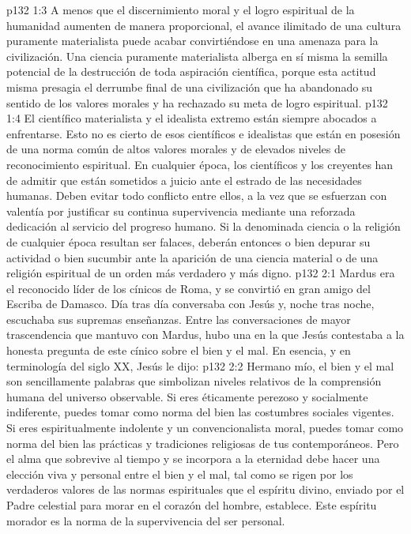 \vs p132 1:3 A menos que el discernimiento moral y el logro espiritual de la humanidad aumenten de manera proporcional, el avance ilimitado de una cultura puramente materialista puede acabar convirtiéndose en una amenaza para la civilización. Una ciencia puramente materialista alberga en sí misma la semilla potencial de la destrucción de toda aspiración científica, porque esta actitud misma presagia el derrumbe final de una civilización que ha abandonado su sentido de los valores morales y ha rechazado su meta de logro espiritual.
\vs p132 1:4 El científico materialista y el idealista extremo están siempre abocados a enfrentarse. Esto no es cierto de esos científicos e idealistas que están en posesión de una norma común de altos valores morales y de elevados niveles de reconocimiento espiritual. En cualquier época, los científicos y los creyentes han de admitir que están sometidos a juicio ante el estrado de las necesidades humanas. Deben evitar todo conflicto entre ellos, a la vez que se esfuerzan con valentía por justificar su continua supervivencia mediante una reforzada dedicación al servicio del progreso humano. Si la denominada ciencia o la religión de cualquier época resultan ser falaces, deberán entonces o bien depurar su actividad o bien sucumbir ante la aparición de una ciencia material o de una religión espiritual de un orden más verdadero y más digno.
\vs p132 2:1 Mardus era el reconocido líder de los cínicos de Roma, y se convirtió en gran amigo del Escriba de Damasco. Día tras día conversaba con Jesús y, noche tras noche, escuchaba sus supremas enseñanzas. Entre las conversaciones de mayor trascendencia que mantuvo con Mardus, hubo una en la que Jesús contestaba a la honesta pregunta de este cínico sobre el bien y el mal. En esencia, y en terminología del siglo XX, Jesús le dijo:
\vs p132 2:2 \pc Hermano mío, el bien y el mal son sencillamente palabras que simbolizan niveles relativos de la comprensión humana del universo observable. Si eres éticamente perezoso y socialmente indiferente, puedes tomar como norma del bien las costumbres sociales vigentes. Si eres espiritualmente indolente y un convencionalista moral, puedes tomar como norma del bien las prácticas y tradiciones religiosas de tus contemporáneos. Pero el alma que sobrevive al tiempo y se incorpora a la eternidad debe hacer una elección viva y personal entre el bien y el mal, tal como se rigen por los verdaderos valores de las normas espirituales que el espíritu divino, enviado por el Padre celestial para morar en el corazón del hombre, establece. Este espíritu morador es la norma de la supervivencia del ser personal.
